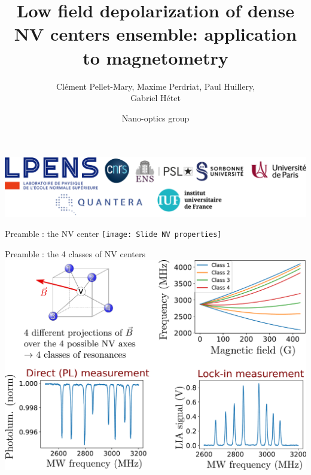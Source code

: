 \documentclass{beamer}
\title{Low field depolarization of dense NV centers ensemble: application to magnetometry}
\author{Clément Pellet-Mary, Maxime Perdriat, Paul Huillery,\\ Gabriel Hétet}
\date{Nano-optics group}
\begin{document}
\begin{frame}
\maketitle
\begin{center}
\includegraphics[width=\textwidth,height=0.3\textheight,keepaspectratio]{logos}
\end{center}
\end{frame}
\begin{frame}{Preamble : the NV center}
\centering
\texttt{[image: Slide  NV properties]}
\end{frame}

\begin{frame}{Preamble : the 4 classes of NV centers}
\centering
\includegraphics[width=\textwidth,height=0.9\textheight,keepaspectratio]{slide ODMR 4 classes}
\end{frame}
\end{document}
